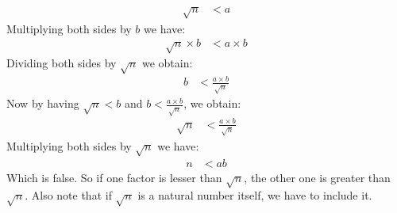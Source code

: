 \documentclass{article}
\begin{document}
\begin{align*}
    \sqrt{n} &< a
\end{align*}
Multiplying both sides by $b$ we have:
\begin{align*}
    \sqrt{n}\times b &< a\times b
\end{align*}
Dividing both sides by $\sqrt{n}$ we obtain:
\begin{align*}
    b &< \frac{a\times b}{\sqrt{n}}
\end{align*}
Now by having $\sqrt{n} < b$ and $b < \frac{a\times b}{\sqrt{n}}$, we obtain:
\begin{align*}
    \sqrt{n} &< \frac{a\times b}{\sqrt{n}}
\end{align*}
Multiplying both sides by $\sqrt{n}$ we have:
\begin{align*}
    n &< ab
\end{align*}
Which is false. So if one factor is lesser than $\sqrt{n}$, the other one is
greater than $\sqrt{n}$. Also note that if $\sqrt{n}$ is a natural number
itself, we have to include it.
\end{document}
